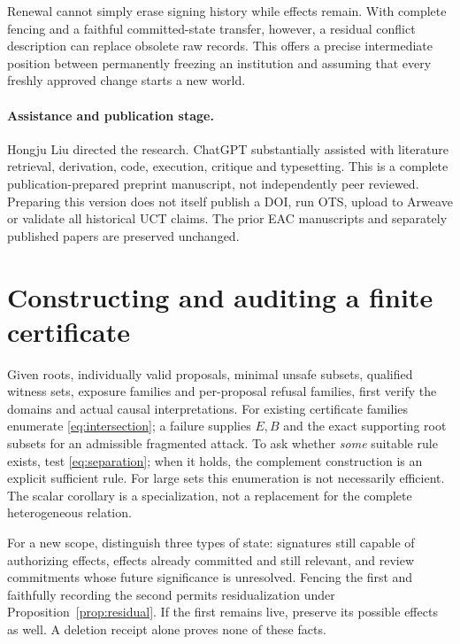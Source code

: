 \documentclass[11pt,a4paper]{article}
\theoremstyle{definition}\newtheorem{definition}{Definition}
\begin{document}
Renewal cannot simply erase signing history while effects remain. With complete fencing and a faithful committed-state transfer, however, a residual conflict description can replace obsolete raw records. This offers a precise intermediate position between permanently freezing an institution and assuming that every freshly approved change starts a new world.

\paragraph{Assistance and publication stage.}
Hongju Liu directed the research. ChatGPT substantially assisted with literature retrieval, derivation, code, execution, critique and typesetting. This is a complete publication-prepared preprint manuscript, not independently peer reviewed. Preparing this version does not itself publish a DOI, run OTS, upload to Arweave or validate all historical UCT claims. The prior EAC manuscripts and separately published papers are preserved unchanged.

\appendix
\section{Constructing and auditing a finite certificate}
Given roots, individually valid proposals, minimal unsafe subsets, qualified witness sets, exposure families and per-proposal refusal families, first verify the domains and actual causal interpretations. For existing certificate families enumerate \cref{eq:intersection}; a failure supplies $E,B$ and the exact supporting root subsets for an admissible fragmented attack. To ask whether \emph{some} suitable rule exists, test \cref{eq:separation}; when it holds, the complement construction is an explicit sufficient rule. For large sets this enumeration is not necessarily efficient. The scalar corollary is a specialization, not a replacement for the complete heterogeneous relation.

For a new scope, distinguish three types of state: signatures still capable of authorizing effects, effects already committed and still relevant, and review commitments whose future significance is unresolved. Fencing the first and faithfully recording the second permits residualization under Proposition~\ref{prop:residual}. If the first remains live, preserve its possible effects as well. A deletion receipt alone proves none of these facts.
\end{document}
